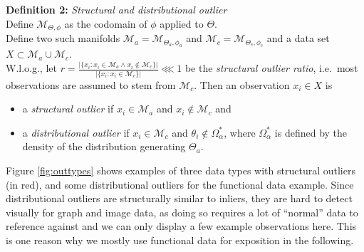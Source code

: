\documentclass[
  10pt]{article}
\providecommand{\tightlist}{%
  \setlength{\itemsep}{0pt}\setlength{\parskip}{0pt}}
\providecommand{\tightlist}{\setlength{\itemsep}{0pt}\setlength{\parskip}{0pt}}
\newcommand{\mani}{\mathcal{M}}
\newcommand{\co}{c}
\newcommand{\an}{a}
\newcommand{\Min}{\mathcal{M}_{\co}}
\newcommand{\Man}{\mathcal{M}_{\an}}
\newcommand{\phin}{\phi_{\co}}
\newcommand{\phan}{\phi_{\an}}
\newcommand{\Thin}{\Theta_{\co}}
\newcommand{\Than}{\Theta_{\an}}
\begin{document}
\noindent \textbf{Definition 2:} \emph{Structural and distributional outlier}\\
Define \(\mani_{\Theta, \phi}\) as the codomain of \(\phi\) applied to \(\Theta\).\\
Define two such manifolds \(\Man = \mani_{\Than, \phan}\) and \(\Min = \mani_{\Thin, \phin}\) and a data set \(X \subset \Man \cup \Min\).\\
W.l.o.g., let \(r = \frac{\vert \{x_i: x_i \in \Man \land x_i \notin \Min\} \vert}{\vert \{x_i: x_i \in \Min\} \vert} \lll 1\) be the \emph{structural outlier ratio}, i.e.~most observations are assumed to stem from \(\Min\). Then an observation \(x_i \in X\) is

\begin{itemize}
\tightlist
\item
  a \emph{structural outlier} if \(x_i \in \Man\) and \(x_i \notin \Min\) and
\item
  a \emph{distributional outlier} if \(x_i \in \Min\) and \(\theta_i \notin \Omega^*_{\alpha}\), where \(\Omega^*_{\alpha}\) is defined by the density of the distribution generating \(\Than\).
\end{itemize}

Figure \ref{fig:outtypes} shows examples of three data types with structural outliers (in red), and some distributional outliers for the functional data example. Since distributional outliers are structurally similar to inliers, they are hard to detect visually for graph and image data, as doing so requires a lot of ``normal'' data to reference against and we can only display a few example observations here. This is one reason why we mostly use functional data for exposition in the following.
\end{document}
